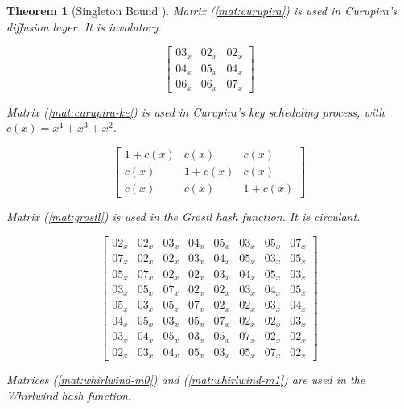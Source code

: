 \documentclass{report}
\newtheorem{theorem}{Theorem}{\bfseries}{\itshape}
\begin{document}
\begin{theorem}[Singleton Bound \cite{SloaneBook}]
Matrix (\ref{mat:curupira}) is used in Curupira's diffusion layer. It is involutory.

\begin{equation}\label{mat:curupira}
\begin{bmatrix}
03_x & 02_x & 02_x\\
04_x & 05_x & 04_x\\
06_x & 06_x & 07_x
\end{bmatrix}
\end{equation}

Matrix (\ref{mat:curupira-ke}) is used in Curupira's key scheduling process, with $c(x) = x^4 + x^3 + x^2$.

\begin{equation}\label{mat:curupira-ke}
\begin{bmatrix}
1+c(x) & c(x) & c(x)\\
c(x) & 1+c(x) & c(x)\\
c(x) & c(x) & 1+c(x)
\end{bmatrix}
\end{equation}

Matrix (\ref{mat:grostl}) is used in the Gr{\o}stl hash function. It is circulant.

\begin{equation}\label{mat:grostl}
\begin{bmatrix}
02_x & 02_x & 03_x & 04_x & 05_x & 03_x & 05_x & 07_x\\
07_x & 02_x & 02_x & 03_x & 04_x & 05_x & 03_x & 05_x\\
05_x & 07_x & 02_x & 02_x & 03_x & 04_x & 05_x & 03_x\\
03_x & 05_x & 07_x & 02_x & 02_x & 03_x & 04_x & 05_x\\
05_x & 03_x & 05_x & 07_x & 02_x & 02_x & 03_x & 04_x\\
04_x & 05_x & 03_x & 05_x & 07_x & 02_x & 02_x & 03_x\\
03_x & 04_x & 05_x & 03_x & 05_x & 07_x & 02_x & 02_x\\
02_x & 03_x & 04_x & 05_x & 03_x & 05_x & 07_x & 02_x
\end{bmatrix}
\end{equation}

Matrices (\ref{mat:whirlwind-m0}) and (\ref{mat:whirlwind-m1}) are used in the Whirlwind hash function.


\end{theorem}
\end{document}
